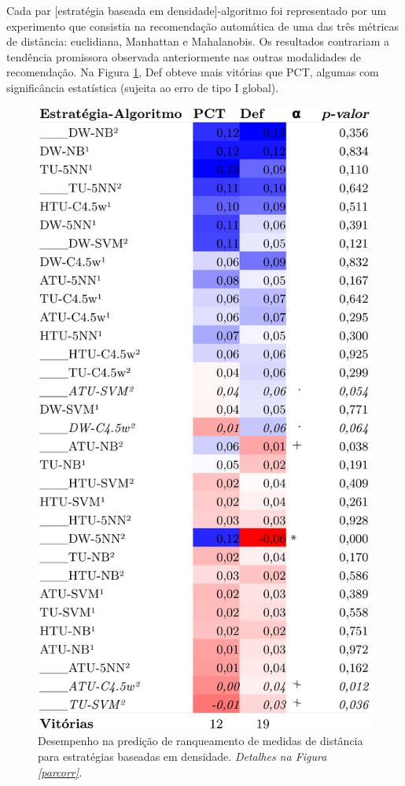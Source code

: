 Cada par [estratégia baseada em densidade]-algoritmo foi representado por um experimento que consistia na recomendação automática de uma das três métricas de distância: euclidiana, Manhattan e Mahalanobis.
Os resultados contrariam a tendência promissora observada anteriormente nas outras modalidades de recomendação.
Na Figura \ref{distcorr}, Def obteve mais vitórias que PCT, algumas com significância estatística (sujeita ao erro de tipo I global).
\begin{figure}
\centering
\includegraphics[scale=0.215]{images/metadistcorr.pdf}
\caption[Desempenho na predição de ranqueamento de medidas de distância.]{Desempenho na predição de ranqueamento de medidas de distância para estratégias baseadas em densidade.
\textit{Detalhes na Figura \ref{parcorr}.}}
\label{distcorr}
\end{figure}

